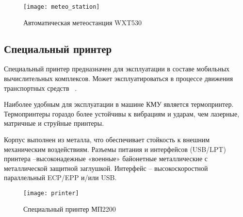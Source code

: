 \begin{figure}[ht]
	\centering
	\texttt{[image: meteo\_station]}
	\caption{Автоматическая метеостанция WXT530~\cite{wxt530}}
	\label{fig:lit_reiview:meteo:meteo_station}
\end{figure}

\subsection{Специальный принтер}
\label{sub:lit_review:spec_printer}
Специальный принтер предназначен для эксплуатации в составе мобильных вычислительных комплексов.
Может эксплуатироваться в процессе движения транспортных средств ~\cite{mp2200}.

Наиболее удобным для эксплуатации в машине КМУ является термопринтер. Термопринтеры гораздо более устойчивы к вибрациям и ударам, чем лазерные, матричные и струйные принтеры.

Корпус выполнен из металла, что обеспечивает стойкость к внешним механическим воздействиям.
Разъемы питания и интерфейсов (USB/LPT) принтера –высоконадежные «военные» байонетные металлические с металлической защитной заглушкой.
Интерфейс – высокоскоростной параллельный ECP/EPP и/или USB.

\begin{figure}[ht]
	\centering
	\texttt{[image: printer]}
	\caption{Специальный принтер МП2200~\cite{mp2200}}
	\label{fig:lit_reiview:spec_printer:printer}
\end{figure}
